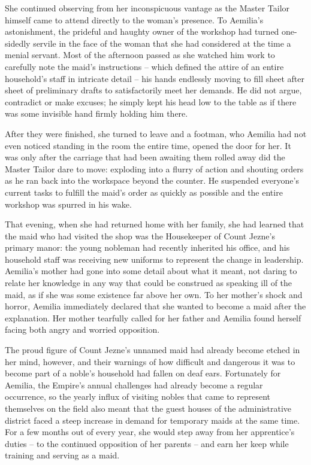  

She continued observing from her inconspicuous vantage as the Master Tailor himself came to attend directly to the woman’s presence. To Aemilia’s astonishment, the prideful and haughty owner of the workshop had turned one-sidedly servile in the face of the woman that she had considered at the time a menial servant. Most of the afternoon passed as she watched him work to carefully note the maid’s instructions – which defined the attire of an entire household’s staff in intricate detail – his hands endlessly moving to fill sheet after sheet of preliminary drafts to satisfactorily meet her demands. He did not argue, contradict or make excuses; he simply kept his head low to the table as if there was some invisible hand firmly holding him there.

 

After they were finished, she turned to leave and a footman, who Aemilia had not even noticed standing in the room the entire time, opened the door for her. It was only after the carriage that had been awaiting them rolled away did the Master Tailor dare to move: exploding into a flurry of action and shouting orders as he ran back into the workspace beyond the counter. He suspended everyone’s current tasks to fulfill the maid’s order as quickly as possible and the entire workshop was spurred in his wake.

 

That evening, when she had returned home with her family, she had learned that the maid who had visited the shop was the Housekeeper of Count Jezne’s primary manor: the young nobleman had recently inherited his office, and his household staff was receiving new uniforms to represent the change in leadership. Aemilia’s mother had gone into some detail about what it meant, not daring to relate her knowledge in any way that could be construed as speaking ill of the maid, as if she was some existence far above her own. To her mother’s shock and horror, Aemilia immediately declared that she wanted to become a maid after the explanation. Her mother tearfully called for her father and Aemilia found herself facing both angry and worried opposition.

 

The proud figure of Count Jezne’s unnamed maid had already become etched in her mind, however, and their warnings of how difficult and dangerous it was to become part of a noble’s household had fallen on deaf ears. Fortunately for Aemilia, the Empire’s annual challenges had already become a regular occurrence, so the yearly influx of visiting nobles that came to represent themselves on the field also meant that the guest houses of the administrative district faced a steep increase in demand for temporary maids at the same time. For a few months out of every year, she would step away from her apprentice’s duties – to the continued opposition of her parents – and earn her keep while training and serving as a maid.

